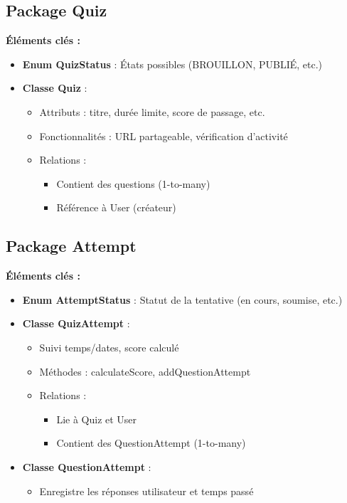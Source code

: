 \documentclass[12pt,a4paper]{report}
\begin{document}
\subsection{Package Quiz}

\textbf{Éléments clés :}
\begin{itemize}
\item \textbf{Enum QuizStatus} : États possibles (BROUILLON, PUBLIÉ, etc.)
\item \textbf{Classe Quiz} :
  \begin{itemize}
  \item Attributs : titre, durée limite, score de passage, etc.
  \item Fonctionnalités : URL partageable, vérification d'activité
  \item Relations :
    \begin{itemize}
    \item Contient des questions (1-to-many)
    \item Référence à User (créateur)
    \end{itemize}
  \end{itemize}
\end{itemize}

\subsection{Package Attempt}

\textbf{Éléments clés :}
\begin{itemize}
\item \textbf{Enum AttemptStatus} : Statut de la tentative (en cours, soumise, etc.)
\item \textbf{Classe QuizAttempt} :
  \begin{itemize}
  \item Suivi temps/dates, score calculé
  \item Méthodes : calculateScore, addQuestionAttempt
  \item Relations :
    \begin{itemize}
    \item Lie à Quiz et User
    \item Contient des QuestionAttempt (1-to-many)
    \end{itemize}
  \end{itemize}
\item \textbf{Classe QuestionAttempt} :
  \begin{itemize}
  \item Enregistre les réponses utilisateur et temps passé
  \end{itemize}
\end{itemize}
\end{document}
